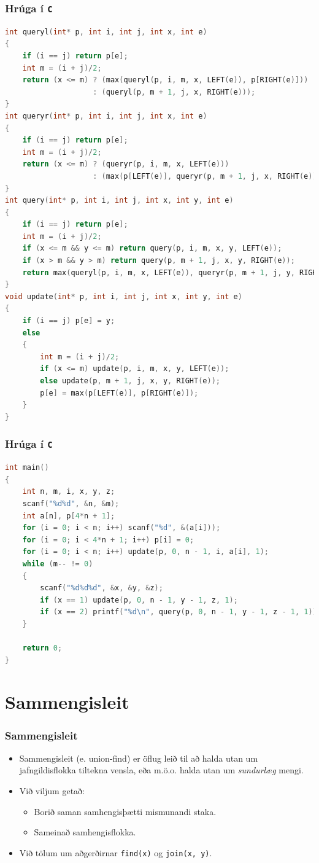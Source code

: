 \documentclass{beamer}
\begin{document}
\begin{frame}[fragile]
	\frametitle{Hrúga í \texttt{C}}
	\tiny
	\begin{lstlisting}[language=C]
int queryl(int* p, int i, int j, int x, int e)
{
	if (i == j) return p[e];
	int m = (i + j)/2;
	return (x <= m) ? (max(queryl(p, i, m, x, LEFT(e)), p[RIGHT(e)]))
                    : (queryl(p, m + 1, j, x, RIGHT(e)));
}
int queryr(int* p, int i, int j, int x, int e)
{
	if (i == j) return p[e];
	int m = (i + j)/2;
	return (x <= m) ? (queryr(p, i, m, x, LEFT(e)))
                    : (max(p[LEFT(e)], queryr(p, m + 1, j, x, RIGHT(e))));
}
int query(int* p, int i, int j, int x, int y, int e)
{
	if (i == j) return p[e];
	int m = (i + j)/2;
	if (x <= m && y <= m) return query(p, i, m, x, y, LEFT(e));
	if (x > m && y > m) return query(p, m + 1, j, x, y, RIGHT(e));
	return max(queryl(p, i, m, x, LEFT(e)), queryr(p, m + 1, j, y, RIGHT(e)));
}
void update(int* p, int i, int j, int x, int y, int e)
{
	if (i == j) p[e] = y;
	else
	{
		int m = (i + j)/2;
		if (x <= m) update(p, i, m, x, y, LEFT(e));
		else update(p, m + 1, j, x, y, RIGHT(e));
		p[e] = max(p[LEFT(e)], p[RIGHT(e)]);
	}
}
	\end{lstlisting}
\end{frame}

\begin{frame}[fragile]
	\frametitle{Hrúga í \texttt{C}}
	\tiny
	\begin{lstlisting}[language=C]
int main()
{
	int n, m, i, x, y, z;
	scanf("%d%d", &n, &m);
	int a[n], p[4*n + 1];
	for (i = 0; i < n; i++) scanf("%d", &(a[i]));
	for (i = 0; i < 4*n + 1; i++) p[i] = 0;
	for (i = 0; i < n; i++) update(p, 0, n - 1, i, a[i], 1);
	while (m-- != 0)
	{
		scanf("%d%d%d", &x, &y, &z);
		if (x == 1) update(p, 0, n - 1, y - 1, z, 1);
		if (x == 2) printf("%d\n", query(p, 0, n - 1, y - 1, z - 1, 1));
	}

	return 0;
}
	\end{lstlisting}
\end{frame}

\section[Sammengisleit]{Sammengisleit}

\begin{frame}
\frametitle{Sammengisleit}
\begin{itemize}

\item<1-> Sammengisleit (e. union-find) er öflug leið til að halda utan um jafngildisflokka tiltekna vensla,
	eða m.ö.o. halda utan um \emph{sundurlæg} mengi.
\item<2-> Við viljum getað:
	\begin{itemize}
		\item<3-> Borið saman samhengisþætti mismunandi staka.
		\item<4-> Sameinað samhengisflokka.
	\end{itemize}
\item<5-> Við tölum um aðgerðirnar \texttt{find(x)} og \texttt{join(x, y)}.

\end{itemize}
\end{frame}
\end{document}
